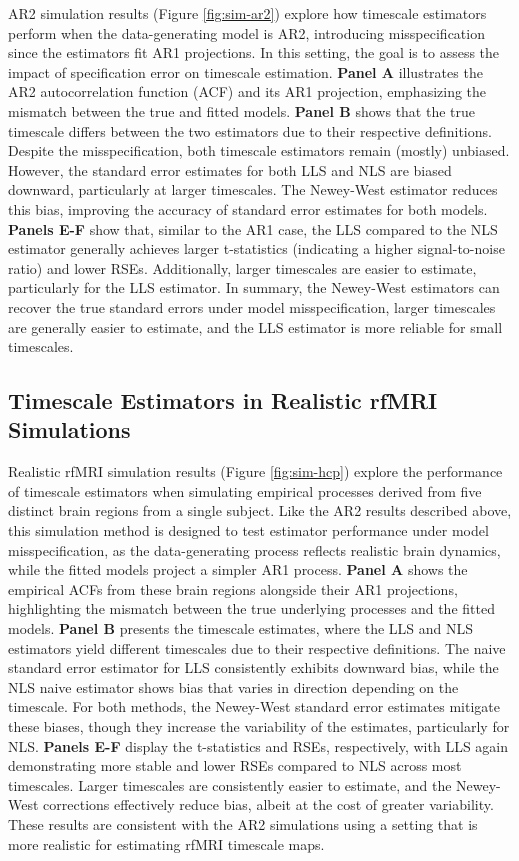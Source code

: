 \documentclass[latex/main.tex]{subfiles}
\begin{document}
AR2 simulation results (Figure \ref{fig:sim-ar2}) explore how timescale estimators perform when the data-generating model is AR2, introducing misspecification since the estimators fit AR1 projections. In this setting, the goal is to assess the impact of specification error on timescale estimation. \textbf{Panel A} illustrates the AR2 autocorrelation function (ACF) and its AR1 projection, emphasizing the mismatch between the true and fitted models. \textbf{Panel B} shows that the true timescale differs between the two estimators due to their respective definitions. Despite the misspecification, both timescale estimators remain (mostly) unbiased. However, the standard error estimates for both LLS and NLS are biased downward, particularly at larger timescales. The Newey-West estimator reduces this bias, improving the accuracy of standard error estimates for both models. \textbf{Panels E-F} show that, similar to the AR1 case, the LLS compared to the NLS estimator generally achieves larger t-statistics (indicating a higher signal-to-noise ratio) and lower RSEs. Additionally, larger timescales are easier to estimate, particularly for the LLS estimator. In summary, the Newey-West estimators can recover the true standard errors under model misspecification, larger timescales are generally easier to estimate, and the LLS estimator is more reliable for small timescales.

\subsection{Timescale Estimators in Realistic rfMRI Simulations}

Realistic rfMRI simulation results (Figure \ref{fig:sim-hcp}) explore the performance of timescale estimators when simulating empirical processes derived from five distinct brain regions from a single subject. Like the AR2 results described above, this simulation method is designed to test estimator performance under model misspecification, as the data-generating process reflects realistic brain dynamics, while the fitted models project a simpler AR1 process. \textbf{Panel A} shows the empirical ACFs from these brain regions alongside their AR1 projections, highlighting the mismatch between the true underlying processes and the fitted models. \textbf{Panel B} presents the timescale estimates, where the LLS and NLS estimators yield different timescales due to their respective definitions. The naive standard error estimator for LLS consistently exhibits downward bias, while the NLS naive estimator shows bias that varies in direction depending on the timescale. For both methods, the Newey-West standard error estimates mitigate these biases, though they increase the variability of the estimates, particularly for NLS. \textbf{Panels E-F} display the t-statistics and RSEs, respectively, with LLS again demonstrating more stable and lower RSEs compared to NLS across most timescales. Larger timescales are consistently easier to estimate, and the Newey-West corrections effectively reduce bias, albeit at the cost of greater variability. These results are consistent with the AR2 simulations using a setting that is more realistic for estimating rfMRI timescale maps.
\end{document}
